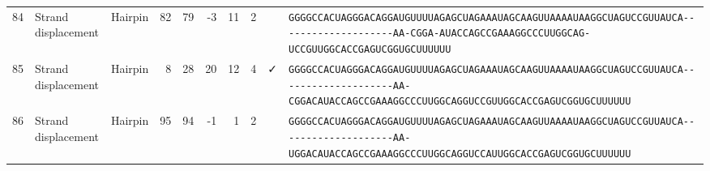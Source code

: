 \begin{tabular}{rllrrrrrcl}
 84 & Strand displacement & Hairpin & 82 & 79 & -3 & 11 & 2 &  &
 \color{ucsfblack}\verb|GGGGCCACUAGGGACAGGAU|\color{ucsfblue}\verb|GUUUUAGAGCUAGAAAUAGCAAGUUAAAAU|\color{ucsfnavy}\verb|AAGGCUAGUCCGU|\color{ucsfteal}\verb|UAUCA--------------------AA-CGGA-|\color{ucsfpurple}\verb|AUACCAGCCGAAAGGCCCUUGGCAG|\color{ucsfteal}\verb|-UCCGUUGGCACCGAGUCGGUGC|\color{ucsfblack}\verb|UUUUUU| \\

 85 & Strand displacement & Hairpin & 8 & 28 & 20 & 12 & 4 & ✓ &
 \color{ucsfblack}\verb|GGGGCCACUAGGGACAGGAU|\color{ucsfblue}\verb|GUUUUAGAGCUAGAAAUAGCAAGUUAAAAU|\color{ucsfnavy}\verb|AAGGCUAGUCCGU|\color{ucsfteal}\verb|UAUCA--------------------AA-CGGAC|\color{ucsfpurple}\verb|AUACCAGCCGAAAGGCCCUUGGCAG|\color{ucsfteal}\verb|GUCCGUUGGCACCGAGUCGGUGC|\color{ucsfblack}\verb|UUUUUU| \\

 86 & Strand displacement & Hairpin & 95 & 94 & -1 & 1 & 2 &  &
 \color{ucsfblack}\verb|GGGGCCACUAGGGACAGGAU|\color{ucsfblue}\verb|GUUUUAGAGCUAGAAAUAGCAAGUUAAAAU|\color{ucsfnavy}\verb|AAGGCUAGUCCGU|\color{ucsfteal}\verb|UAUCA--------------------AA-UGGAC|\color{ucsfpurple}\verb|AUACCAGCCGAAAGGCCCUUGGCAG|\color{ucsfteal}\verb|GUCCAUUGGCACCGAGUCGGUGC|\color{ucsfblack}\verb|UUUUUU| \\

\bottomrule
\end{tabular}
